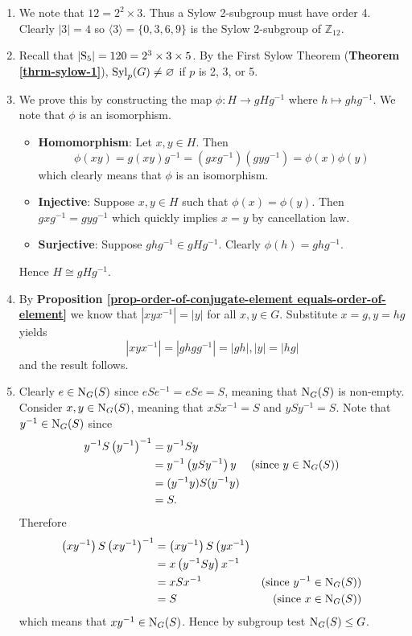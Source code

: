 \begin{enumerate}
    \item We note that $12 = 2^2 \times 3$. Thus a Sylow 2-subgroup must have order 4. Clearly $|3| = 4$ so $\langle 3 \rangle = \{0, 3, 6, 9\}$ is the Sylow 2-subgroup of $\mathbb{Z}_{12}$.

    \item Recall that $|\mathrm{S}_{5}| = 120 = 2^3 \times 3 \times 5$. By the First Sylow Theorem (\textbf{Theorem \ref{thrm-sylow-1}}), $\mathrm{Syl}_{p}(G) \neq \varnothing$ if $p$ is 2, 3, or 5.

    \item We prove this by constructing the map $\phi: H \to gHg^{-1}$ where $h \mapsto ghg^{-1}$. We note that $\phi$ is an isomorphism.
    \begin{itemize}
        \item \textbf{Homomorphism}: Let $x, y \in H$. Then
        \[
            \phi(xy) = g(xy)g^{-1} = (gxg^{-1})(gyg^{-1}) = \phi(x)\phi(y)
        \]
        which clearly means that $\phi$ is an isomorphism.
        \item \textbf{Injective}: Suppose $x, y \in H$ such that $\phi(x) = \phi(y)$. Then $gxg^{-1} = gyg^{-1}$ which quickly implies $x = y$ by cancellation law.
        \item \textbf{Surjective}: Suppose $ghg^{-1} \in gHg^{-1}$. Clearly $\phi(h) = ghg^{-1}$.
    \end{itemize}
    Hence $H \cong gHg^{-1}$.

    \item By \textbf{Proposition \ref{prop-order-of-conjugate-element equals-order-of-element}} we know that $|xyx^{-1}| = |y|$ for all $x, y \in G$. Substitute $x = g, y = hg$ yields
    \[
        |xyx^{-1}| = |ghgg^{-1}| = |gh|, |y| = |hg|
    \]
    and the result follows.

    \item Clearly $e \in \mathrm{N}_{G}(S)$ since $eSe^{-1} = eSe = S$, meaning that $\mathrm{N}_{G}(S)$ is non-empty. Consider $x, y \in \mathrm{N}_{G}(S)$, meaning that $xSx^{-1} = S$ and $ySy^{-1} = S$. Note that $y^{-1} \in \mathrm{N}_{G}(S)$ since
    \begin{align*}
        y^{-1}S\left(y^{-1}\right)^{-1} &= y^{-1}Sy\\
        &= y^{-1}\left(ySy^{-1}\right)y & \text{(since } y \in \mathrm{N}_{G}(S))\\
        &= (y^{-1}y)S(y^{-1}y)\\
        &= S.
    \end{align*}
    Therefore
    \begin{align*}
        \left(xy^{-1}\right)S\left(xy^{-1}\right)^{-1} &= \left(xy^{-1}\right)S\left(yx^{-1}\right)\\
        &= x\left(y^{-1}Sy\right)x^{-1}\\
        &= xSx^{-1} & \text{(since } y^{-1} \in \mathrm{N}_{G}(S))\\
        &= S & \text{(since } x \in \mathrm{N}_{G}(S))
    \end{align*}
    which means that $xy^{-1} \in \mathrm{N}_{G}(S)$. Hence by subgroup test $\mathrm{N}_{G}(S) \leq G$.


\end{enumerate}
